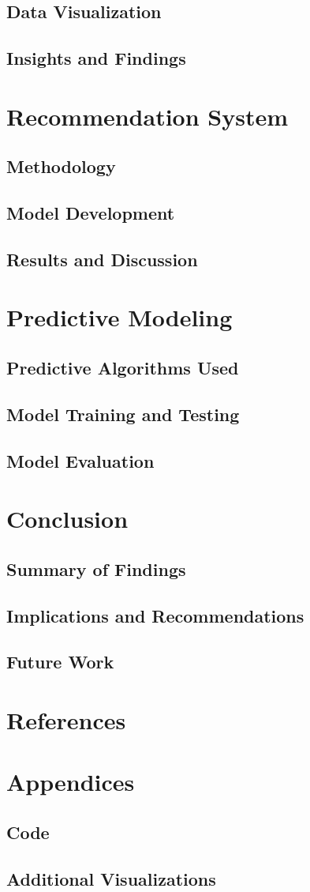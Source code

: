 \documentclass{article}
\begin{document}
\subsection{Data Visualization}
\subsection{Insights and Findings}

\section{Recommendation System}
\subsection{Methodology}
\subsection{Model Development}
\subsection{Results and Discussion}

\section{Predictive Modeling}
\subsection{Predictive Algorithms Used}
\subsection{Model Training and Testing}
\subsection{Model Evaluation}

\section{Conclusion}
\subsection{Summary of Findings}
\subsection{Implications and Recommendations}
\subsection{Future Work}

\section{References}

\section{Appendices}
\subsection{Code}
\subsection{Additional Visualizations}
\end{document}
